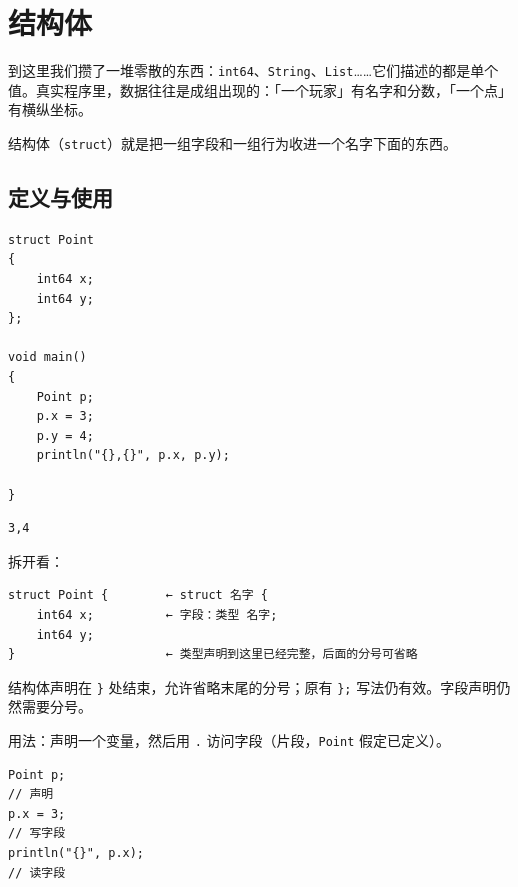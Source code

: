 \chapter{结构体}
\label{ch:09}

到这里我们攒了一堆零散的东西：\texttt{int64}、\texttt{String}、\texttt{List}……它们描述的都是单个值。真实程序里，数据往往是成组出现的：「一个玩家」有名字和分数，「一个点」有横纵坐标。

结构体（\texttt{struct}）就是把一组字段和一组行为收进一个名字下面的东西。

\section{定义与使用}

\par
\medskip
\begin{lstlisting}[style=chali]
struct Point
{
    int64 x;
    int64 y;
};

void main()
{
    Point p;
    p.x = 3;
    p.y = 4;
    println("{},{}", p.x, p.y);

}
\end{lstlisting}
\par
\medskip

\par
\medskip
\begin{lstlisting}[style=out]
3,4
\end{lstlisting}
\par
\medskip

拆开看：

\par
\medskip
\begin{lstlisting}[style=out]
struct Point {        ← struct 名字 { 
    int64 x;          ← 字段：类型 名字;
    int64 y;
}                     ← 类型声明到这里已经完整，后面的分号可省略
\end{lstlisting}
\par
\medskip

结构体声明在 \texttt{\}} 处结束，允许省略末尾的分号；原有 \texttt{\};} 写法仍有效。字段声明仍然需要分号。

用法：声明一个变量，然后用 \texttt{.\allowbreak{}} 访问字段（片段，\texttt{Point} 假定已定义）。

\par
\medskip
\begin{lstlisting}[style=chali]
Point p;
// 声明
p.x = 3;
// 写字段
println("{}", p.x);
// 读字段
\end{lstlisting}
\par
\medskip

